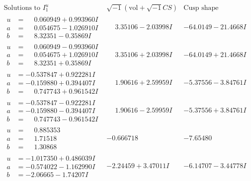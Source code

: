 \documentclass[1p]{elsarticle_modified}
\theoremstyle{definition}
\newcommand{\I}{\sqrt{-1}}
\begin{document}
$$\begin{array}{c|c|c}  
\text{Solutions to }I^u_{1}& \I (\text{vol} + \sqrt{-1}CS) & \text{Cusp shape}\\
 \hline 
\begin{aligned}
u &= \phantom{-}0.060949 + 0.993960 I \\
a &= \phantom{-}0.054675 - 1.026910 I \\
b &= \phantom{-}8.32351 - 0.35869 I\end{aligned}
 & \phantom{-}3.35106 - 2.03998 I & -64.0149 - 21.4668 I \\ \hline\begin{aligned}
u &= \phantom{-}0.060949 - 0.993960 I \\
a &= \phantom{-}0.054675 + 1.026910 I \\
b &= \phantom{-}8.32351 + 0.35869 I\end{aligned}
 & \phantom{-}3.35106 + 2.03998 I & -64.0149 + 21.4668 I \\ \hline\begin{aligned}
u &= -0.537847 + 0.922281 I \\
a &= -0.159880 + 0.394407 I \\
b &= \phantom{-}0.747743 + 0.961542 I\end{aligned}
 & \phantom{-}1.90616 + 2.59959 I & -5.37556 - 3.84761 I \\ \hline\begin{aligned}
u &= -0.537847 - 0.922281 I \\
a &= -0.159880 - 0.394407 I \\
b &= \phantom{-}0.747743 - 0.961542 I\end{aligned}
 & \phantom{-}1.90616 - 2.59959 I & -5.37556 + 3.84761 I \\ \hline\begin{aligned}
u &= \phantom{-}0.885353\phantom{ +0.000000I} \\
a &= \phantom{-}1.71518\phantom{ +0.000000I} \\
b &= \phantom{-}1.30868\phantom{ +0.000000I}\end{aligned}
 & -0.666718\phantom{ +0.000000I} & -7.65480\phantom{ +0.000000I} \\ \hline\begin{aligned}
u &= -1.017350 + 0.486039 I \\
a &= -0.574022 - 1.162990 I \\
b &= -2.06665 - 1.74207 I\end{aligned}
 & -2.24459 + 3.47011 I & -6.14707 - 3.44778 I \\ \hline\begin{aligned}

\end{aligned}
\end{array}$$
\end{document}
